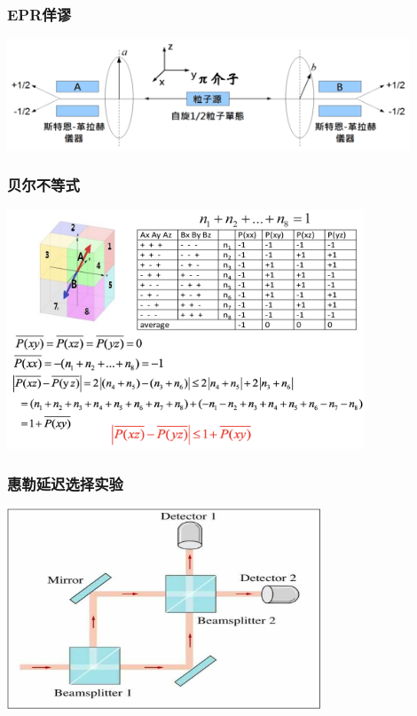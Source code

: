  \begin{frame}
     \frametitle{EPR佯谬}
     \begin{center}
         \includegraphics[width=0.9\textwidth]{figs/28.png} \\
     \end{center} 
 \end{frame}
 
 \begin{frame}
     \frametitle{贝尔不等式}
     \begin{center}
         \includegraphics[width=0.8\textwidth]{figs/bell.png} \\
     \end{center} 
 \end{frame}
 
 \begin{frame}
     \frametitle{惠勒延迟选择实验}
     \begin{center}
         \includegraphics[width=0.7\textwidth]{figs/choose.png} \\
     \end{center} 
 \end{frame}
 
